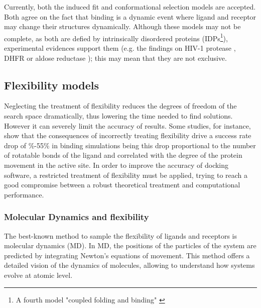 Currently, both the induced fit and conformational selection models are accepted. Both agree on the fact that binding is a dynamic event where ligand and receptor may change their structures dynamically. Although these models may not be complete, as both are defied by intrinsically disordered proteins (IDPs\footnote{A fourth model "coupled folding and binding" \cite{wright_linking_2009}}), experimental evidences support them (e.g. the findings on HIV-1 protease \cite{wlodawer_inhibitors_1998}, DHFR \cite{bystroff_crystal_1991}  or aldose reductase \cite{wilson_refined_1993} ); this may mean that they are not exclusive. 

\subsection{Flexibility models} 

Neglecting the treatment of flexibility reduces the degrees of freedom of the search space dramatically, thus lowering the time needed to find solutions. However it can severely limit the accuracy of results. Some studies, for instance, show that the consequences of incorrectly treating flexibility drive a success rate drop of  \%-55\% in binding simulations  \cite{erickson_lessons_2004} being this drop proportional to the number of rotatable bonds of the ligand and correlated with the degree of the protein movement in the active site. In order to improve the accuracy of docking software, a restricted treatment of flexibility must be applied, trying to reach a good compromise between a robust theoretical treatment and computational performance. 

\subsubsection{Molecular Dynamics and flexibility}

The best-known method to sample the flexibility of ligands and receptors is molecular dynamics (MD). In MD, the positions of the particles of the system are predicted by integrating Newton's equations of movement. This method offers a detailed vision of the dynamics of molecules, allowing to understand how systems evolve at atomic level. 

